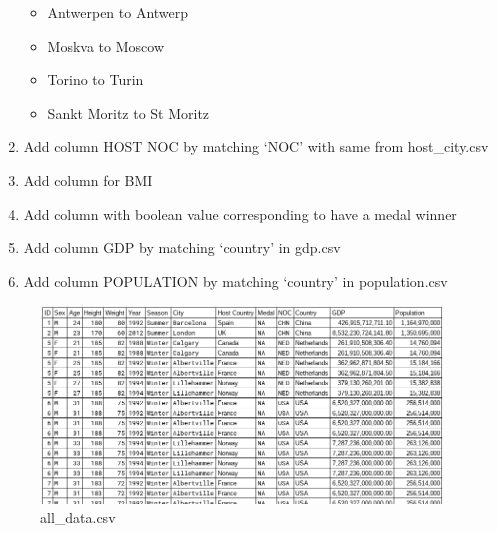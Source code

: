 \documentclass[a4 paper, 12pt]{article}
\begin{document}
\begin{enumerate}
\begin{itemize}
                    \item Antwerpen to Antwerp
                    \item Moskva to Moscow
                    \item Torino to Turin
                    \item Sankt Moritz to St Moritz
                \end{itemize}                 
            \item Add column HOST NOC by matching ‘NOC’ with same from host\_city.csv
            \item Add column for BMI
            \item Add column with boolean value corresponding to have a medal winner
            \item Add column GDP by matching ‘country’ in gdp.csv
            \item Add column POPULATION by matching ‘country’ in population.csv  
        \end{enumerate}
    
        \begin{figure} [H]
            \centering
            \includegraphics[width=0.95\textwidth, frame]
                {./images/new_data.png}     
            \caption{all\_data.csv}               
        \end{figure} 
\end{document}
